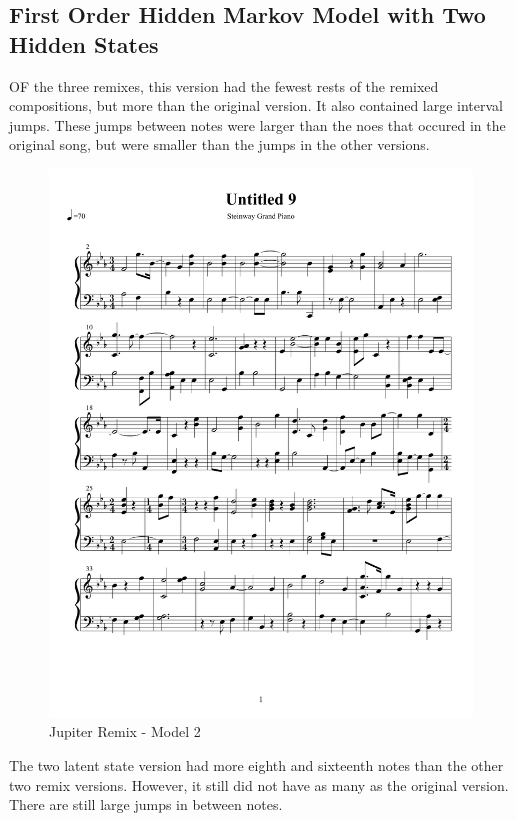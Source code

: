 \documentclass{article} %
\begin{document}
\subsection{First Order Hidden Markov Model with Two Hidden States}

OF the three remixes, this version had the fewest rests of the remixed compositions, but more than the original version. It also contained large interval jumps. These jumps between notes were larger than the noes that occured in the original song, but were smaller than the jumps in the other versions. 


\begin{figure}[H]
\centering
\caption{Jupiter Remix - Model 2}
\includegraphics [scale = 0.6] {JupiterRemix2H-cropped.pdf}
\end{figure}

The two latent state version had more eighth and sixteenth notes than the other two remix versions. However, it still did not have as many as the original version. There are still large jumps in between notes. 
\end{document}
